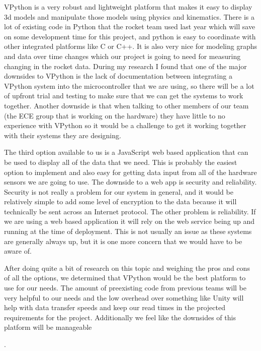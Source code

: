 \documentclass[10pt,draftclsnofoot,onecolumn,retainorgcmds]{IEEEtran}
\begin{document}
VPython is a very robust and lightweight platform that makes it easy to display 3d models and manipulate those models using physics and kinematics. There is a lot of existing code in Python that the rocket team used last year which will save on some development time for this project, and python is easy to coordinate with other integrated platforms like C or C++. It is also very nice for modeling graphs and data over time changes which our project is going to need for measuring changing in the rocket data. During my research I found that one of the major downsides to VPython is the lack of documentation between integrating a VPython system into the microcontroller that we are using, so there will be a lot of upfront trial and testing to make sure that we can get the systems to work together. Another downside is that when talking to other members of our team (the ECE group that is working on the hardware) they have little to no experience with VPython so it would be a challenge to get it working together with their systems they are designing.\par

The third option available to us is a JavaScript web based application that can be used to display all of the data that we need. This is probably the easiest option to implement and also easy for getting data input from all of the hardware sensors we are going to use. The downside to a web app is security and reliability. Security is not really a problem for our system in general, and it would be relatively simple to add some level of encryption to the data because it will technically be sent across an Internet protocol. The other problem is reliability. If we are using a web based application it will rely on the web service being up and running at the time of deployment. This is not usually an issue as these systems are generally always up, but it is one more concern that we would have to be aware of.\par

After doing quite a bit of research on this topic and weighing the pros and cons of all the options, we determined that VPython would be the best platform to use for our needs. The amount of preexisting code from previous teams will be very helpful to our needs and the low overhead over something like Unity will help with data transfer speeds and keep our read times in the projected requirements for the project. Additionally we feel like the downsides of this platform will be manageable\par.
\end{document}
